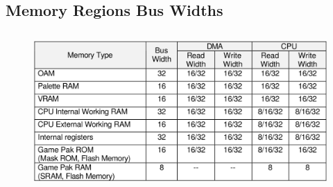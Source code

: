 \documentclass[11pt,a4paper]{article}
\begin{document}
	\subsection{Memory Regions Bus Widths}
\begin{center}
	\begin{figure}[ht!]
	\includegraphics[height=6cm, keepaspectratio=true]{accesstimes}
	\end{figure}\cite{GBAManual}
\end{center}
\end{document}
